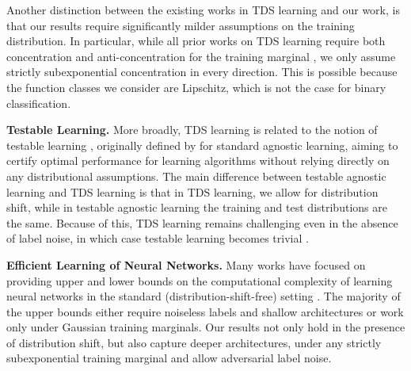 \documentclass[11pt]{article} %
\numberwithin{equation}{section}
\begin{document}
Another distinction between the existing works in TDS learning and our work, is that our results require significantly milder assumptions on the training distribution. In particular, while all prior works on TDS learning require both concentration and anti-concentration for the training marginal \cite{klivans2023testable,klivans2024learning,chandrasekaran2024efficient}, we only assume strictly subexponential concentration in every direction. This is possible because the function classes we consider are Lipschitz, which is not the case for binary classification.

\noindent\textbf{Testable Learning.} More broadly, TDS learning is related to the notion of testable learning \cite{rubinfeld2022testing,gollakota2022moment,gollakota2023efficient,diakonikolas2023efficient,gollakota2024tester,diakonikolas2024testable,slot2024testably}, originally defined by \cite{rubinfeld2022testing} for standard agnostic learning, aiming to certify optimal performance for learning algorithms without relying directly on any distributional assumptions. The main difference between testable agnostic learning and TDS learning is that in TDS learning, we allow for distribution shift, while in testable agnostic learning the training and test distributions are the same. Because of this, TDS learning remains challenging even in the absence of label noise, in which case testable learning becomes trivial \cite{klivans2023testable}.


\noindent\textbf{Efficient Learning of Neural Networks.} Many works have focused on providing upper and lower bounds on the computational complexity of learning neural networks in the standard (distribution-shift-free) setting \cite{reliable_goel2017,goel2019learning,goel2020superpolynomial,goel2020statistical,diakonikolas2020approximation,diakonikolas2020near,diakonikolas2020algorithms,diakonikolas2022learning,chen2022hardness,chen2022learning,chen2023learning,wang2023robustly,gollakota2024agnostically,diakonikolas2024efficiently,li2020learning,gao2019learning,zhang2019learning,vempala2019gradient,allen2019learning,bakshi2019learning,manurangsi2018computational,ge2019learning,ge2018learning,du2018convolutional,goel2018learning,tian2017analytical,li2017convergence,brutzkus2017globally,zhong2017recovery,zhang2016l1,janzamin2015beating}. The majority of the upper bounds either require noiseless labels and shallow architectures or work only under Gaussian training marginals. Our results not only hold in the presence of distribution shift, but also capture deeper architectures, under any strictly subexponential training marginal and allow adversarial label noise.
\end{document}
